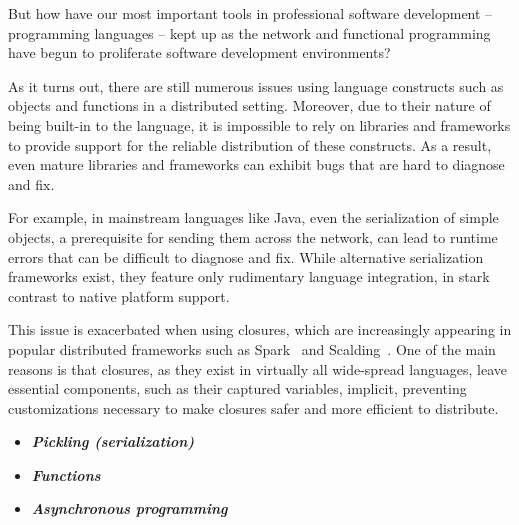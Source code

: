 
But how have our most important tools in professional software development --
programming languages -- kept up as the network and functional programming have
begun to proliferate software development environments?

As it turns out, there are still numerous issues using language constructs such
as objects and functions in a distributed setting. Moreover, due to their nature
of being built-in to the language, it is impossible to rely on libraries and
frameworks to provide support for the reliable distribution of these constructs.
As a result, even mature libraries and frameworks can exhibit bugs that are hard
to diagnose and fix.

For example, in mainstream languages like Java, even the serialization of simple
objects, a prerequisite for sending them across the network, can lead to runtime
errors that can be difficult to diagnose and fix. While alternative
serialization frameworks exist, they feature only rudimentary language
integration, in stark contrast to native platform support.

This issue is exacerbated when using closures, which are increasingly appearing
in popular distributed frameworks such as Spark~\cite{Spark} and
Scalding~\cite{Scalding}. One of the main reasons is that closures, as they
exist in virtually all wide-spread languages, leave essential components, such
as their captured variables, implicit, preventing customizations necessary to
make closures safer and more efficient to distribute.

\begin{itemize}
  \item {\bf \em Pickling (serialization)}
  \item {\bf \em Functions}
  \item {\bf \em Asynchronous programming}
\end{itemize}

